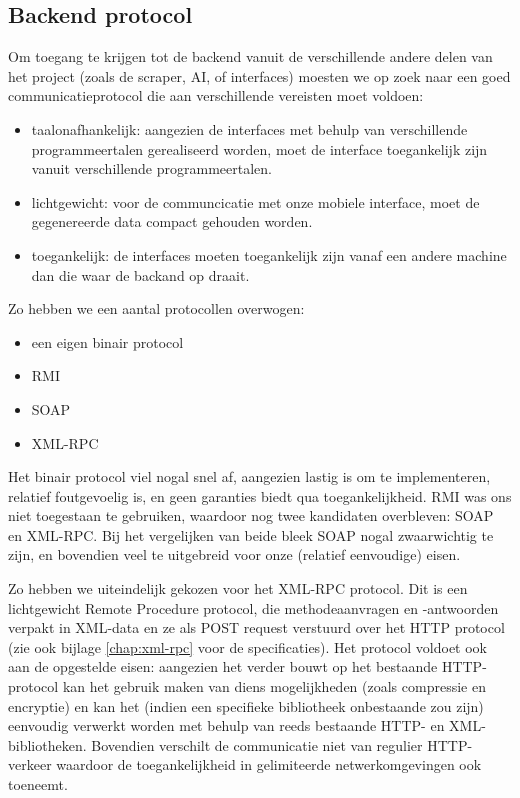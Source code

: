 \subsection{Backend protocol}

Om toegang te krijgen tot de backend vanuit de verschillende andere delen van het project (zoals de scraper, AI, of interfaces) moesten we op zoek naar een goed communicatieprotocol die aan verschillende vereisten moet voldoen:
\begin{itemize}
\item{taalonafhankelijk: aangezien de interfaces met behulp van verschillende programmeertalen gerealiseerd worden, moet de interface toegankelijk zijn vanuit verschillende programmeertalen.}
\item{lichtgewicht: voor de communcicatie met onze mobiele interface, moet de gegenereerde data compact gehouden worden.}
\item{toegankelijk: de interfaces moeten toegankelijk zijn vanaf een andere machine dan die waar de backand op draait.}
\end{itemize}

Zo hebben we een aantal protocollen overwogen:
\begin{itemize}
\item{een eigen binair protocol}
\item{RMI}
\item{SOAP}
\item{XML-RPC}
\end{itemize}

Het binair protocol viel nogal snel af, aangezien lastig is om te implementeren, relatief foutgevoelig is, en geen garanties biedt qua toegankelijkheid. RMI was ons niet toegestaan te gebruiken, waardoor nog twee kandidaten overbleven: SOAP en XML-RPC. Bij het vergelijken van beide bleek SOAP nogal zwaarwichtig te zijn, en bovendien veel te uitgebreid voor onze (relatief eenvoudige) eisen.

Zo hebben we uiteindelijk gekozen voor het XML-RPC protocol. Dit is een lichtgewicht Remote Procedure protocol, die methodeaanvragen en -antwoorden verpakt in XML-data en ze als POST request verstuurd over het HTTP protocol (zie ook bijlage \ref{chap:xml-rpc} voor de specificaties).
Het protocol voldoet ook aan de opgestelde eisen: aangezien het verder bouwt op het bestaande HTTP-protocol kan het gebruik maken van diens mogelijkheden (zoals compressie en encryptie) en kan het (indien een specifieke bibliotheek onbestaande zou zijn) eenvoudig verwerkt worden met behulp van reeds bestaande HTTP- en XML-bibliotheken. Bovendien verschilt de communicatie niet van regulier HTTP-verkeer waardoor de toegankelijkheid in gelimiteerde netwerkomgevingen ook toeneemt.

